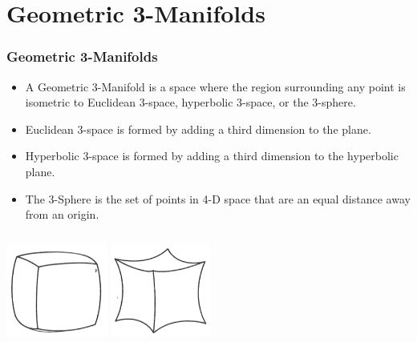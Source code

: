 \documentclass[13pt]{beamer}
\begin{document}
\section{Geometric 3-Manifolds} %
\begin{frame}
\frametitle{Geometric 3-Manifolds}
  \begin{itemize}
    \item A \alert{Geometric 3-Manifold} is a space where the region surrounding any point is isometric to Euclidean 3-space, hyperbolic 3-space, or the 3-sphere.
    \item \alert{Euclidean 3-space} is formed by adding a third dimension to the plane.
    \item \alert{Hyperbolic 3-space} is formed by adding a third dimension to the hyperbolic plane.
    \item \alert{The 3-Sphere} is the set of points in 4-D space that are an equal distance away from an origin.
  \end{itemize}
  \begin{columns}[r] %
     \centering
      \includegraphics[height=3cm]{./img/cube3sphere}
     \centering
     \includegraphics[height=3cm]{./img/cubeH3}
  \end{columns}
\end{frame}
\end{document}
